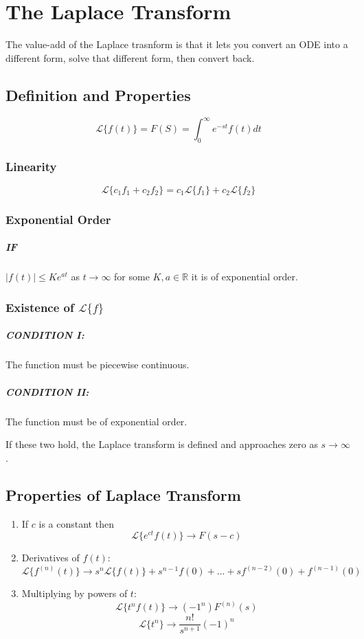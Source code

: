 \documentclass[a4paper,12pt]{report}
\begin{document}
\chapter{The Laplace Transform}
The value-add of the Laplace trasnform is that it lets you convert an ODE into a different form, solve that different form,
then convert back.
\section{Definition and Properties}
$$\mathcal{L}\{f(t)\} = F(S) = \int_0^{\infty} e^{-st} f(t)dt$$

\subsection{Linearity}
$$\mathcal{L}\{ c_1f_1 + c_2f_2\} = c_1\mathcal{L}\{ f_1 \} + c_2 \mathcal{L}\{ f_2 \}$$

\subsection{Exponential Order}
\paragraph{IF } $|f(t)| \leq Ke^{at}$ as $t\to\infty$ for some $K, a \in \mathbb{R}$ it is of exponential order. 

\subsection{Existence of $\mathcal{L}\{ f \}$}
\paragraph{CONDITION I: } The function must be piecewise continuous.
\paragraph{CONDITION II: } The function must be of exponential order. 

If these two hold, the Laplace transform is defined and approaches zero as $s\to\infty$.

\section{Properties of Laplace Transform}
\begin{enumerate}
\item If $c$ is a constant then $$\mathcal{L}\{ e^{ct}f(t) \} \to F(s-c)$$
\item Derivatives of $f(t)$: 
$$\mathcal{L}\{ f^{(n)}(t) \} \to s^n \mathcal{L}\{ f(t) \} + s^{n-1} f(0) + ... + sf^{(n-2)}(0) + f^{(n-1)}(0)$$
\item Multiplying by powers of $t$: 
$$\mathcal{L}\{ t^n f(t) \} \to (-1^n)F^{(n)}(s)$$
$$\mathcal{L}\{ t^n \} \to \frac{n!}{s^{n+1}}(-1)^n$$
\end{enumerate}
\end{document}
